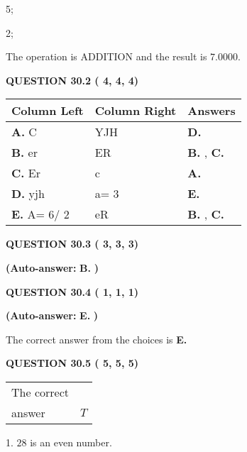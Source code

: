 \documentclass[12pt]{article}
\begin{document}
5;
 
2;
 
The operation is  %
ADDITION and the result is
$ %
7.0000$.
 
  
  
{\textbf{\large{QUESTION
30.2 
 (          4,          4,          4)
}}}
 
 
\noindent{}
  
  
\begin{tabular}{|l|l|l|}
 \hline
 Column Left & Column Right  & Answers       \\ 
 \hline
{\textbf{\large{
A.}}}
C
  & 
YJH
 & 
{\textbf{\large{
D.}}}
 \\ 
 \hline
{\textbf{\large{
B.}}}
er
  & 
ER
 & 
{\textbf{\large{
B.}}}
, 
{\textbf{\large{
C.}}}
 \\ 
 \hline
{\textbf{\large{
C.}}}
Er
  & 
c
 & 
{\textbf{\large{
A.}}}
 \\ 
 \hline
{\textbf{\large{
D.}}}
yjh
  & 
 a= %
3
 & 
{\textbf{\large{
E.}}}
 \\ 
 \hline
{\textbf{\large{
E.}}}
 A= %
6/ %
2

  & 
eR
 & 
{\textbf{\large{
B.}}}
, 
{\textbf{\large{
C.}}}
 \\ 
 \hline
 \end{tabular}
  
  
\noindent{}
 
 
  
  
{\textbf{\large{QUESTION
30.3 
 (          3,          3,          3)
}}}
 
 
{\textbf{(Auto-answer:}}
{\textbf{\large{
B.}}}
{\textbf{)}}
 
 
  
  
{\textbf{\large{QUESTION
30.4 
 (          1,          1,          1)
}}}
 
 
{\textbf{(Auto-answer:}}
{\textbf{\large{
E.}}}
{\textbf{)}}
 
 

The correct answer from the choices is
{\textbf{\large{
E.}}}
 
  
  
{\textbf{\large{QUESTION
30.5 
 (          5,          5,          5)
}}}

 
\noindent\begin{tabular}{|l|l|}\hline The correct & \\
          answer &  %
$T$ \\ \hline \end{tabular}
1. $ %
28$ is an  %
even number.
 
\end{document}
